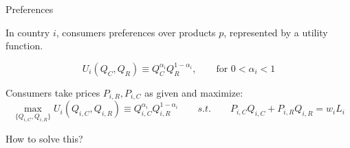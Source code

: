 \documentclass[notes,11pt, aspectratio=169, xcolor=table]{beamer}
\newenvironment{wideitemize}{\itemize\addtolength{\itemsep}{10pt}}{\enditemize}
\begin{document}
\begin{frame}{Preferences}
\begin{wideitemize}
        \item In country $i$, consumers preferences over products $p$, represented by a utility function. 

        \begin{equation*}
            U_i(Q_C,Q_R) \equiv Q_C^{\alpha_i} Q_R^{1-\alpha_i}, \qquad \text{for } 0 < \alpha_i < 1   
        \end{equation*}
        \item Consumers take prices $P_{i,R},P_{i,C}$ as given and maximize: 
        \begin{equation*}
            \max_{\{Q_{i,C}, Q_{i,R}\}} U_i(Q_{i,C}, Q_{i,R}) \equiv Q_{i,C}^{\alpha_i} Q_{i,R}^{1-\alpha_i} \qquad s.t. \qquad P_{i,C} Q_{i,C} + P_{i,R} Q_{i,R} = w_i L_i
        \end{equation*}
        \item How to solve this?
        \end{wideitemize}
\end{frame}
\end{document}
